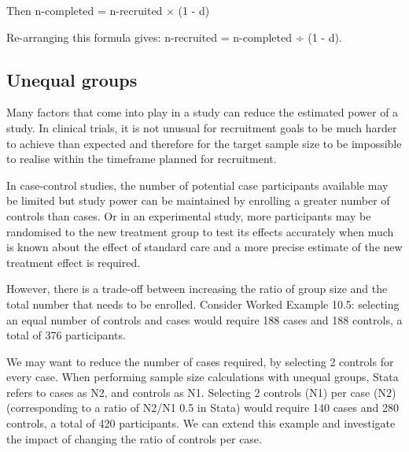 \documentclass[
]{memoir}
\begin{document}
Then n-completed = n-recruited × (1 - d)

Re-arranging this formula gives: n-recruited = n-completed ÷ (1 - d).

\hypertarget{unequal-groups}{%
\subsection{Unequal groups}\label{unequal-groups}}

Many factors that come into play in a study can reduce the estimated power of a study. In clinical trials, it is not unusual for recruitment goals to be much harder to achieve than expected and therefore for the target sample size to be impossible to realise within the timeframe planned for recruitment.

In case-control studies, the number of potential case participants available may be limited but study power can be maintained by enrolling a greater number of controls than cases. Or in an experimental study, more participants may be randomised to the new treatment group to test its effects accurately when much is known about the effect of standard care and a more precise estimate of the new treatment effect is required.

However, there is a trade-off between increasing the ratio of group size and the total number that needs to be enrolled. Consider Worked Example 10.5: selecting an equal number of controls and cases would require 188 cases and 188 controls, a total of 376 participants.

We may want to reduce the number of cases required, by selecting 2 controls for every case. When performing sample size calculations with unequal groups, Stata refers to cases as N2, and controls as N1. Selecting 2 controls (N1) per case (N2) (corresponding to a ratio of N2/N1 0.5 in Stata) would require 140 cases and 280 controls, a total of 420 participants. We can extend this example and investigate the impact of changing the ratio of controls per case.

 
  \providecommand{\huxb}[2]{\arrayrulecolor[RGB]{#1}\global\arrayrulewidth=#2pt}
  \providecommand{\huxvb}[2]{\color[RGB]{#1}\vrule width #2pt}
  \providecommand{\huxtpad}[1]{\rule{0pt}{#1}}
  \providecommand{\huxbpad}[1]{\rule[-#1]{0pt}{#1}}
\end{document}
